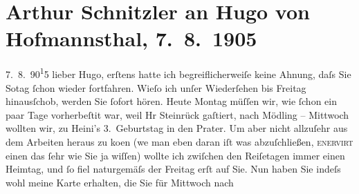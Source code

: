 

         
         \newcommand{\erwaehntePersonen}{Personen: Hugo von Hofmannsthal, Heinrich Schnitzler, Albert Steinrück}
         \newcommand{\erwaehnteOrte}{Orte: Mödling, Prater, Schloß Schönbrunn, Wien, Wurstelprater}
         \newcommand{\erwaehnteWerke}{Werke: Der Ruf des Lebens [Filmentwurf], Zwischenspiel. Komödie in drei Akten}
               \section[Arthur Schnitzler an Hugo von Hofmannsthal, 7. 8. 1905]{ Arthur Schnitzler an Hugo von Hofmannsthal, 7. 8. 1905}\nopagebreak{}\rehead{ }\begin{ledgroupsized}[t]{13cm}\normalsize\beginnumbering \toendnotes[C]{\smallbreak\pagebreak[2]} 
\toendnotes[C]{\smallbreak}\pstart
           \raggedleft{}{\pb}7. 8. 90\substVorne{}\textsuperscript{1}\substDazwischen{}5\substHinten{}\pend
           \pstart
           lieber Hugo, erſtens hatte ich begreiflicherweiſe keine Ahnung, daſs
               Sie So{\geminationn}tag{ }ſchon  wieder
               fortfahren. Wieſo ich unſer Wiederſehen bis Freitag hinausſchob, werden Sie ſofort
               hören. Heute Montag müſſen wir, wie ſchon ein paar Tage vorherbeſti{\geminationm}t war, weil Hr Steinrück gaſtiert, nach Mödling –
                  Mittwoch wollten {\pb}wir, zu Heini’s 3. Geburtstag in den Prater. Um aber nicht allzuſehr aus dem Arbeiten heraus zu ko{\geminationm}en (we{\geminationn} man eben daran iſt
               was abzuſchließen, \textsc{enervirt} einen das ſehr wie Sie ja
               wiſſen) wollte ich zwiſchen den Reiſetagen immer einen Heimtag, und ſo fiel
               naturgemäſs der Freitag erſt auf Sie. {\pb}Nun
               haben Sie indeſs wohl meine Karte erhalten, die Sie für Mittwoch nach

\end{ledgroupsized}
